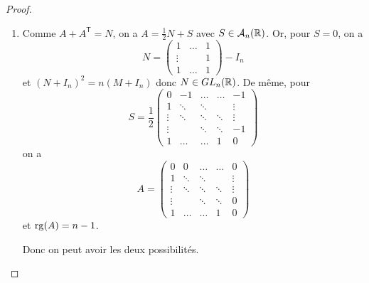 \documentclass[12pt]{article}
\begin{document}
\begin{proof}
\begin{enumerate}
        \item Comme $A+A^{\mathsf{T}}=N$, on a $A=\frac{1}{2}N+S$ avec $S\in\mathcal{A}_{n}(\mathbb{R})$. Or, pour $S=0$, on a 
        \begin{equation}
            N=\begin{pmatrix}
                1&\dots&1\\
                \vdots & &1\\
                1 & \dots &1
            \end{pmatrix}
            -I_{n}
        \end{equation}
        et $(N+I_{n})^{2}=n(M+I_{n})$ donc $N\in GL_{n}(\mathbb{R})$. De même, pour 
        \begin{equation}
            S=\frac{1}{2}
            \begin{pmatrix}
                0&-1 &\dots & \dots& -1\\
                1 & \ddots & \ddots & & \vdots\\
                \vdots & \ddots & \ddots & \ddots & \vdots\\
                \vdots & & \ddots & \ddots & -1\\
                1 &\dots & \dots & 1 & 0
            \end{pmatrix}
        \end{equation}
        on a
        \begin{equation}
            A=
            \begin{pmatrix}
                0&0 &\dots & \dots& 0\\
                1 & \ddots & \ddots & & \vdots\\
                \vdots & \ddots & \ddots & \ddots & \vdots\\
                \vdots & & \ddots & \ddots & 0\\
                1 &\dots & \dots & 1 & 0
            \end{pmatrix}
        \end{equation}
        et $\operatorname{rg}(A)=n-1$.

        Donc on peut avoir les deux possibilités.
    \end{enumerate}
\end{proof}
\end{document}
